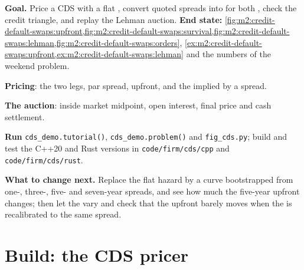 \begin{tutorial}
\textbf{Goal.} Price a CDS with a flat , convert quoted spreads into  for both , check the credit triangle, and replay the Lehman
auction.
\textbf{End state:} \cref{fig:m2:credit-default-swaps:upfront,fig:m2:credit-default-swaps:survival,fig:m2:credit-default-swaps:lehman,fig:m2:credit-default-swaps:orders},
\cref{ex:m2:credit-default-swaps:upfront,ex:m2:credit-default-swaps:lehman} and the
numbers of the weekend problem.
\begin{tutsteps}
\item \textbf{Pricing}: the two legs, par spread, upfront, and the  implied by
a spread.
\label{lst:m2:credit-default-swaps:price}
\item \textbf{The auction}: inside market midpoint, open interest, final price and cash
settlement.
\label{lst:m2:credit-default-swaps:auction}
\item \textbf{Run} \texttt{cds\_demo.tutorial()}, \texttt{cds\_demo.problem()} and
\texttt{fig\_cds.py}; build and test the C++20 and Rust versions in
\texttt{code/firm/cds/cpp} and \texttt{code/firm/cds/rust}.
\end{tutsteps}
\textbf{What to change next.} Replace the flat hazard by a curve bootstrapped from one-,
three-, five- and seven-year spreads, and see how much the five-year upfront changes;
then let the  vary and check that the upfront barely moves when the
 is recalibrated to the same spread.
\end{tutorial}

\section{Build: the CDS pricer}\label{bld:m2:credit-default-swaps:cds}

